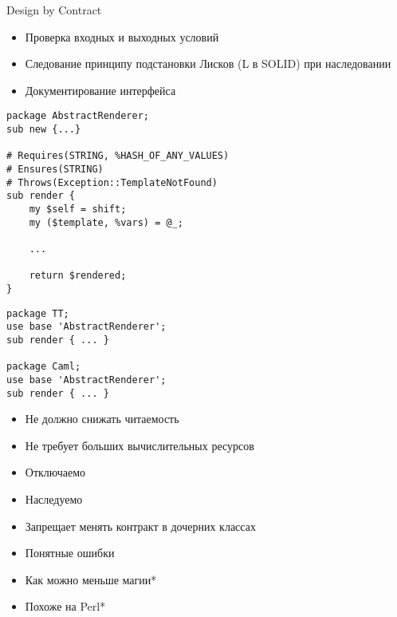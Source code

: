 \documentclass[14pt]{beamer}
\begin{document}
\begin{frame}
    \begin{center}
        Design by Contract
    \end{center}
\end{frame}

\begin{frame}
    \begin{center}
        \begin{itemize}
            \item Проверка входных и выходных условий
            \pause
            \item Следование принципу подстановки Лисков (L в SOLID) при
                наследовании
            \pause
            \item Документирование интерфейса
        \end{itemize}
    \end{center}
\end{frame}

\begin{frame}[fragile]
    \begin{lstlisting}
package AbstractRenderer;
sub new {...}

# Requires(STRING, %HASH_OF_ANY_VALUES)
# Ensures(STRING)
# Throws(Exception::TemplateNotFound)
sub render {
    my $self = shift;
    my ($template, %vars) = @_;

    ...

    return $rendered;
}
    \end{lstlisting}
\end{frame}

\begin{frame}[fragile]
    \begin{lstlisting}
package TT;
use base 'AbstractRenderer';
sub render { ... }

package Caml;
use base 'AbstractRenderer';
sub render { ... }
    \end{lstlisting}
\end{frame}

\begin{frame}
    \begin{center}
        \begin{itemize}
            \item Не должно снижать читаемость
            \pause
            \item Не требует больших вычислительных ресурсов
            \pause
            \item Отключаемо
            \pause
            \item Наследуемо
            \pause
            \item Запрещает менять контракт в дочерних классах
            \pause
            \item Понятные ошибки
            \pause
            \item Как можно меньше магии*
            \pause
            \item Похоже на Perl*
        \end{itemize}
    \end{center}
\end{frame}
\end{document}
